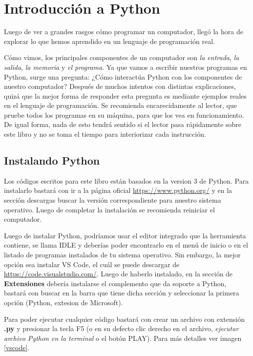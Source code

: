 \chapter{Introducción a Python}

Luego de ver a grandes rasgos cómo programar un computador, llegó la hora de explorar lo que hemos aprendido en un lenguaje de programación real. 

Cómo vimos, los principales componentes de un computador son \emph{la entrada}, \emph{la salida}, \emph{la memoria} y \emph{el programa}. Ya que vamos a escribir nuestros programas en Python, surge una pregunta: ¿Cómo interactúa Python con los componentes de nuestro computador? Después de muchos intentos con distintas explicaciones, quizá que la mejor forma de responder esta pregunta es mediante ejemplos reales en el lenguaje de programación. Se recomienda encarecidamente al lector, que pruebe todos los programas en su máquina, para que los vea en funcionamiento. De igual forma, nada de esto tendrá sentido si el lector pasa rápidamente sobre este libro y no se toma el tiempo para interiorizar cada instrucción.

\section{Instalando Python}

Los códigos escritos para este libro están basados en la version 3 de Python. Para instalarlo bastará con ir a la página oficial \url{https://www.python.org/} y en la sección descargas buscar la versión correspondiente para nuestro sistema operativo. Luego de completar la instalación se recomienda reiniciar el computador.

Luego de instalar Python, podríamos usar el editor integrado que la herramienta contiene, se llama IDLE y deberías poder encontrarlo en el menú de inicio o en el listado de programas instalados de tu sistema operativo. Sin embargo, la mejor opción sea instalar VS Code, el cuál se puede descargar de \url{https://code.visualstudio.com/}. Luego de haberlo instalado, en la sección de \textbf{Extensiones} debería instalarse el complemento que da soporte a Python, bastará con buscar en la barra que tiene dicha sección y seleccionar la primera opción (Python, extesion de Microsoft).

Para poder ejecutar cualquier código bastará con crear un archivo con extensión \textbf{.py} y presionar la tecla F5 (o en su defecto clic derecho en el archivo, \emph{ejecutar archivo Python en la terminal} o el botón PLAY). Para más detalles ver imagen \ref{vscode}.

